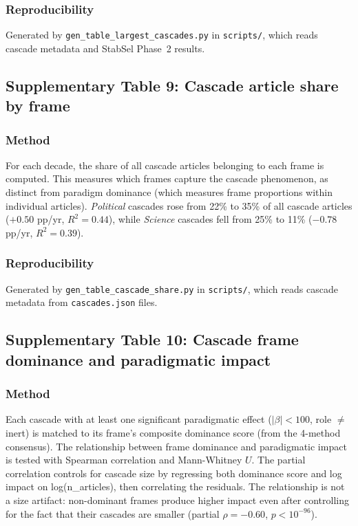 \documentclass[11pt]{article}
\begin{document}
\subsubsection*{Reproducibility}
Generated by \texttt{gen\_table\_largest\_cascades.py} in \texttt{scripts/},
which reads cascade metadata and StabSel Phase~2 results.


\newpage
\subsection*{Supplementary Table 9: Cascade article share by frame}



\subsubsection*{Method}
For each decade, the share of all cascade articles belonging to each frame is computed. This measures which frames capture the cascade phenomenon, as distinct from paradigm dominance (which measures frame proportions within individual articles). \emph{Political} cascades rose from 22\% to 35\% of all cascade articles ($+0.50$ pp/yr, $R^2 = 0.44$), while \emph{Science} cascades fell from 25\% to 11\% ($-0.78$ pp/yr, $R^2 = 0.39$).

\subsubsection*{Reproducibility}
Generated by \texttt{gen\_table\_cascade\_share.py} in \texttt{scripts/},
which reads cascade metadata from \texttt{cascades.json} files.


\newpage
\subsection*{Supplementary Table 10: Cascade frame dominance and paradigmatic impact}



\subsubsection*{Method}
Each cascade with at least one significant paradigmatic effect ($|\beta| < 100$, role $\neq$ inert) is matched to its frame's composite dominance score (from the 4-method consensus). The relationship between frame dominance and paradigmatic impact is tested with Spearman correlation and Mann-Whitney $U$. The partial correlation controls for cascade size by regressing both dominance score and log impact on log(n\_articles), then correlating the residuals. The relationship is not a size artifact: non-dominant frames produce higher impact even after controlling for the fact that their cascades are smaller (partial $\rho = -0.60$, $p < 10^{-96}$).
\end{document}
